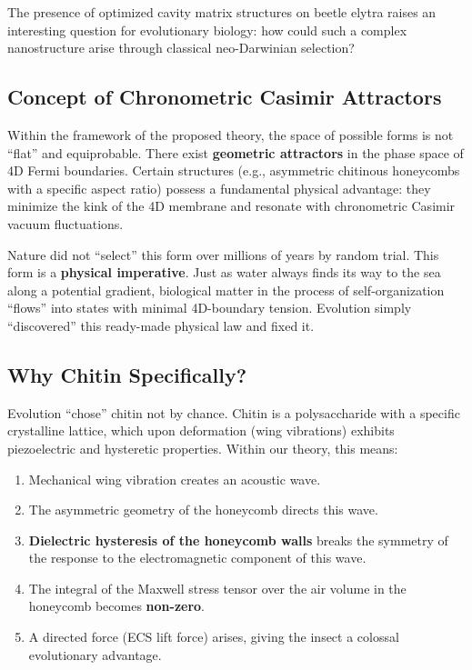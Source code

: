 \documentclass[12pt,a4paper]{article}
\begin{document}
The presence of optimized cavity matrix structures on beetle elytra raises an interesting question for evolutionary biology: how could such a complex nanostructure arise through classical neo-Darwinian selection?

\subsection{Concept of Chronometric Casimir Attractors}

Within the framework of the proposed theory, the space of possible forms is not ``flat'' and equiprobable. There exist \textbf{geometric attractors} in the phase space of 4D Fermi boundaries. Certain structures (e.g., asymmetric chitinous honeycombs with a specific aspect ratio) possess a fundamental physical advantage: they minimize the kink of the 4D membrane and resonate with chronometric Casimir vacuum fluctuations.

Nature did not ``select'' this form over millions of years by random trial. This form is a \textbf{physical imperative}. Just as water always finds its way to the sea along a potential gradient, biological matter in the process of self-organization ``flows'' into states with minimal 4D-boundary tension. Evolution simply ``discovered'' this ready-made physical law and fixed it.

\subsection{Why Chitin Specifically?}

Evolution ``chose'' chitin not by chance. Chitin is a polysaccharide with a specific crystalline lattice, which upon deformation (wing vibrations) exhibits piezoelectric and hysteretic properties. Within our theory, this means:
\begin{enumerate}
    \item Mechanical wing vibration creates an acoustic wave.
    \item The asymmetric geometry of the honeycomb directs this wave.
    \item \textbf{Dielectric hysteresis of the honeycomb walls} breaks the symmetry of the response to the electromagnetic component of this wave.
    \item The integral of the Maxwell stress tensor over the air volume in the honeycomb becomes \textbf{non-zero}.
    \item A directed force (ECS lift force) arises, giving the insect a colossal evolutionary advantage.
\end{enumerate}
\end{document}
